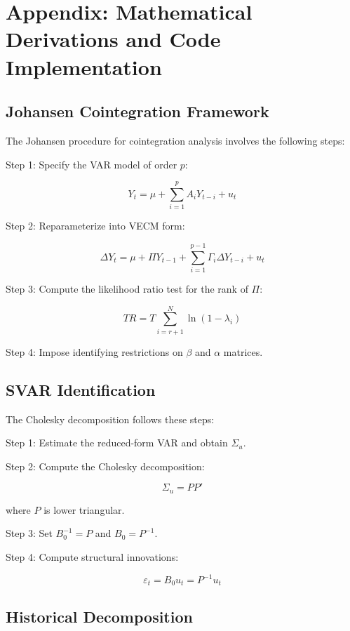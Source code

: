 \documentclass[
  manuscript=article,
  layout=publish,
  year=2026,
  volume=6,
]{den}
\begin{document}
\section{Appendix: Mathematical Derivations and Code
Implementation}\label{appendix-mathematical-derivations-and-code-implementation}

\subsection{Johansen Cointegration
Framework}\label{johansen-cointegration-framework}

The Johansen procedure for cointegration analysis involves the following
steps:

Step 1: Specify the VAR model of order \(p\):

\[
Y_t = \mu + \sum_{i=1}^{p} A_i Y_{t-i} + u_t
\]

Step 2: Reparameterize into VECM form:

\[
\Delta Y_t = \mu + \Pi Y_{t-1} + \sum_{i=1}^{p-1} \Gamma_i \Delta Y_{t-i} + u_t
\]

Step 3: Compute the likelihood ratio test for the rank of \(\Pi\):

\[
TR = T\sum_{i=r+1}^{N} \ln(1 - \lambda_i)
\]

Step 4: Impose identifying restrictions on \(\beta\) and \(\alpha\)
matrices.

\subsection{SVAR Identification}\label{svar-identification}

The Cholesky decomposition follows these steps:

Step 1: Estimate the reduced-form VAR and obtain \(\Sigma_u\).

Step 2: Compute the Cholesky decomposition:

\[
\Sigma_u = PP'
\]

where \(P\) is lower triangular.

Step 3: Set \(B_0^{-1} = P\) and \(B_0 = P^{-1}\).

Step 4: Compute structural innovations:

\[
\varepsilon_t = B_0 u_t = P^{-1} u_t
\]

\subsection{Historical Decomposition}\label{historical-decomposition-1}
\end{document}
